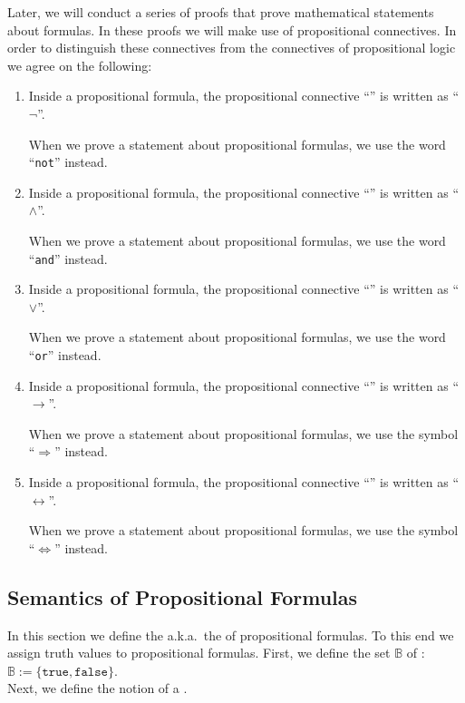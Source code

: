 \remarkEng
Later, we will conduct a series of proofs that prove mathematical statements about formulas.
In these proofs we will make use of propositional connectives.  In order to distinguish these connectives from
the connectives of propositional logic we agree on the following:
\begin{enumerate}
\item Inside a propositional formula, the propositional connective
      ``'' is written as ``$\neg$''.
  
      When we prove a statement about propositional formulas, we use the word ``\texttt{not}'' instead.
\item Inside a propositional formula, the propositional connective
      ``'' is written as ``$\wedge$''.
  
      When we prove a statement about propositional formulas, we use the word ``\texttt{and}'' instead.
\item Inside a propositional formula, the propositional connective
      ``'' is written as ``$\vee$''.
  
      When we prove a statement about propositional formulas, we use the word ``\texttt{or}'' instead.
\item Inside a propositional formula, the propositional connective
      ``'' is written as ``$\rightarrow$''.
  
      When we prove a statement about propositional formulas, we use the symbol ``$\Rightarrow$'' instead.
\item Inside a propositional formula, the propositional connective
      ``'' is written as ``$\leftrightarrow$''.
  
      When we prove a statement about propositional formulas, we use the symbol ``$\Leftrightarrow$'' instead.
      \eox
\end{enumerate}

\subsection{Semantics of Propositional Formulas}
In this section we define the  a.k.a.~the  of propositional
formulas.  To this end we assign truth values to propositional formulas.  First, we define the set 
$\mathbb{B}$  of :  \\[0.2cm] 
\hspace*{1.3cm} $\mathbb{B} := \{ \texttt{true}, \texttt{false} \}$. \\[0.2cm]
Next, we define the notion of a .

